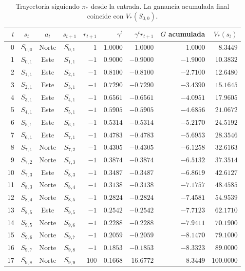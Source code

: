 \documentclass[11pt,letterpaper]{article}
\begin{document}
\begin{table}[H]
\centering
\footnotesize
\setlength{\tabcolsep}{4pt}
\caption{Trayectoria siguiendo $\pi_*$ desde la entrada. La ganancia acumulada final coincide con $V_*(S_{0,0})$.}
\label{tab:trayectoria}
\begin{tabular}{rcccrrrrr}
\toprule
$t$ & $s_t$ & $a_t$ & $s_{t+1}$ & $r_{t+1}$ & $\gamma^t$ & $\gamma^t r_{t+1}$ & $G$ acumulada & $V_*(s_t)$ \\
\midrule
0 & $S_{0,0}$ & Norte & $S_{0,1}$ & $-1$ & $1.0000$ & $-1.0000$ & $-1.0000$ & $8.3449$ \\
1 & $S_{0,1}$ & Este & $S_{1,1}$ & $-1$ & $0.9000$ & $-0.9000$ & $-1.9000$ & $10.3832$ \\
2 & $S_{1,1}$ & Este & $S_{2,1}$ & $-1$ & $0.8100$ & $-0.8100$ & $-2.7100$ & $12.6480$ \\
3 & $S_{2,1}$ & Este & $S_{3,1}$ & $-1$ & $0.7290$ & $-0.7290$ & $-3.4390$ & $15.1645$ \\
4 & $S_{3,1}$ & Este & $S_{4,1}$ & $-1$ & $0.6561$ & $-0.6561$ & $-4.0951$ & $17.9605$ \\
5 & $S_{4,1}$ & Este & $S_{5,1}$ & $-1$ & $0.5905$ & $-0.5905$ & $-4.6856$ & $21.0672$ \\
6 & $S_{5,1}$ & Este & $S_{6,1}$ & $-1$ & $0.5314$ & $-0.5314$ & $-5.2170$ & $24.5192$ \\
7 & $S_{6,1}$ & Este & $S_{7,1}$ & $-1$ & $0.4783$ & $-0.4783$ & $-5.6953$ & $28.3546$ \\
8 & $S_{7,1}$ & Norte & $S_{7,2}$ & $-1$ & $0.4305$ & $-0.4305$ & $-6.1258$ & $32.6163$ \\
9 & $S_{7,2}$ & Norte & $S_{7,3}$ & $-1$ & $0.3874$ & $-0.3874$ & $-6.5132$ & $37.3514$ \\
10 & $S_{7,3}$ & Este & $S_{8,3}$ & $-1$ & $0.3487$ & $-0.3487$ & $-6.8619$ & $42.6127$ \\
11 & $S_{8,3}$ & Norte & $S_{8,4}$ & $-1$ & $0.3138$ & $-0.3138$ & $-7.1757$ & $48.4585$ \\
12 & $S_{8,4}$ & Norte & $S_{8,5}$ & $-1$ & $0.2824$ & $-0.2824$ & $-7.4581$ & $54.9539$ \\
13 & $S_{8,5}$ & Este & $S_{9,5}$ & $-1$ & $0.2542$ & $-0.2542$ & $-7.7123$ & $62.1710$ \\
14 & $S_{9,5}$ & Norte & $S_{9,6}$ & $-1$ & $0.2288$ & $-0.2288$ & $-7.9411$ & $70.1900$ \\
15 & $S_{9,6}$ & Norte & $S_{9,7}$ & $-1$ & $0.2059$ & $-0.2059$ & $-8.1470$ & $79.1000$ \\
16 & $S_{9,7}$ & Norte & $S_{9,8}$ & $-1$ & $0.1853$ & $-0.1853$ & $-8.3323$ & $89.0000$ \\
17 & $S_{9,8}$ & Norte & $S_{9,9}$ & $100$ & $0.1668$ & $16.6772$ & $8.3449$ & $100.0000$ \\
\bottomrule
\end{tabular}
\end{table}
\end{document}
